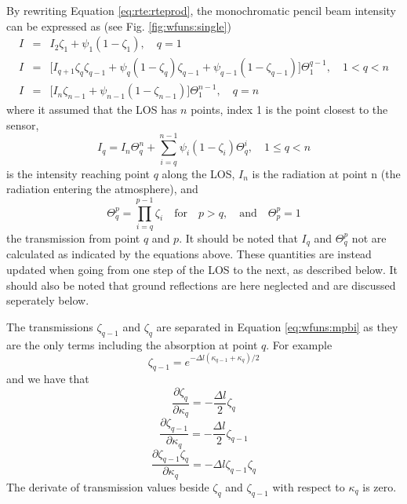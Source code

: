 By rewriting Equation \ref{eq:rte:rteprod}, the monochromatic pencil beam
 intensity can be expressed as (see Fig. \ref{fig:wfuns:single})
 \begin{eqnarray}
   I &=& I_2\zeta_1+\psi_1(1-\zeta_1), \quad q=1 
     \nonumber \\
   I &=&\Big[I_{q+1}\zeta_q\zeta_{q-1}+\psi_q(1-\zeta_q)\zeta_{q-1} +
            \psi_{q-1}(1-\zeta_{q-1}) \Big] \Theta^{q-1}_1, \quad 1<q<n 
    \label{eq:wfuns:mpbi} \\
   I &=& \Big[I_n\zeta_{n-1}+\psi_{n-1}(1-\zeta_{n-1})\Big]\Theta^{n-1}_{1}, \quad q=n
     \nonumber
 \end{eqnarray}
 where it assumed that the LOS has $n$ points, index 1 is the point
 closest to the sensor,
 \begin{equation}
   I_q = I_n \Theta^{n}_{q} + \sum_{i=q}^{n-1}\psi_i(1-\zeta_i) 
             \Theta_{q}^{i}, \quad 1 \leq q < n
  \label{eq:wfuns:iq}
 \end{equation}
 is the intensity reaching point $q$ along the LOS, $I_n$ is the radiation at
 point n (the radiation entering the atmosphere), and
 \begin{equation}
   \Theta_q^p = \prod_{i=q}^{p-1}\zeta_i\quad \mathrm{for} \quad p>q, 
     \quad \mathrm{and} \quad \Theta_p^p = 1
  \label{eq:wfuns:Theta}
 \end{equation}
 the transmission from point $q$ and $p$. It should be noted that
 $I_q$ and $\Theta_q^p$ not are calculated as indicated by the
 equations above. These quantities are instead updated when going from
 one step of the LOS to the next, as described below. It should also be
 noted that ground reflections are here neglected and are discussed 
 seperately below.

 The transmissions $\zeta_{q-1}$ and $\zeta_q$ are separated in Equation
 \ref{eq:wfuns:mpbi} as they are the only terms including the absorption
 at point $q$. For example
 \begin{equation}
   \zeta_{q-1} = e^{-\Delta l(\kappa_{q-1}+\kappa_q)/2}
 \end{equation}
 and we have that
 \begin{equation}
   \frac{\partial \zeta_q}{\partial \kappa_q} = -\frac{\Delta l}{2}\zeta_q
  \label{eq:wfuns:dzeta1}
 \end{equation}
 \begin{equation}
   \frac{\partial\zeta_{q-1}}{\partial \kappa_q}=-\frac{\Delta l}{2}\zeta_{q-1}
 \end{equation}
 \begin{equation}
   \frac{\partial \zeta_{q-1}\zeta_q}{\partial \kappa_q} = 
          -\Delta l \zeta_{q-1}\zeta_q
  \label{eq:wfuns:dzeta2}
 \end{equation}
 The derivate of transmission values beside $\zeta_q$ and
 $\zeta_{q-1}$ with respect to $\kappa_q$ is zero.

